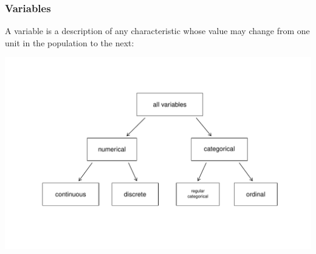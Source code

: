 \documentclass[slides]{beamer}
\newcommand{\blue}[1]{\textcolor{blue2}{#1}}
\begin{document}
\begin{frame}[fragile]
\frametitle{Variables}

%
%
\ifslides
\else
A \blue{variable} is a description of any characteristic whose value may change from one unit in the population to the next:
\begin{center}
\includegraphics[width=\linewidth]{figure/flow-chart} 
\end{center}
\fi
%
%
%
%
%
%


\end{frame}
\end{document}

